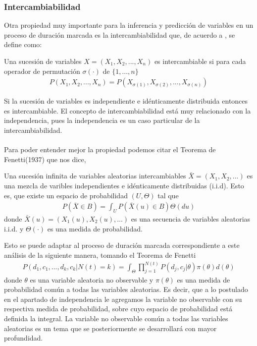 \subsubsection{Intercambiabilidad}
Otra propiedad muy importante para la inferencia y predicci\'on de variables en un proceso de duraci\'on marcada es la intercambiabilidad que, de acuerdo a \cite{hahn2012exchangeable}, se define como:
\begin{defi}
Una sucesi\'on de variables $X=(X_1,X_2,...,X_n)$ es intercambiable si para cada operador de permutaci\'on $\sigma(\cdot)$ de $\{1,...,n\}$ 
\begin{align}
P(X_1,X_2,...,X_n)=P(X_{\sigma(1)},X_{\sigma(2)},...,X_{\sigma(n)}) \nonumber
\end{align}
\end{defi}
Si la sucesi\'on de variables es independiente e id\'enticamente distribuida entonces es intercambiable. El concepto de intercambiabilidad est\'a muy relacionado con la independencia, pues la independencia es un caso particular de la intercambiabilidad.\\
\\
Para poder entender mejor la propiedad podemos citar el Teorema de Fenetti(1937) que nos dice,
\begin{teo}
Una sucesi\'on infinita de variables aleatorias intercambiables $\bar{X}=(X_1,X_2,...)$ es una mezcla de varibles independientes e id\'enticamente distribuidas (i.i.d). Esto es, que existe un espacio de probabilidad $(U,\Theta)$ tal que
\begin{align}
P(\bar{X} \in B)=\int_U P(\bar{X}(u) \in B) \Theta(du)   \nonumber
\end{align}
donde $\bar{X}(u)=(X_1(u),X_2(u),...)$ es una secuencia de variables aleatorias i.i.d. y $\Theta(\cdot)$ es una medida de probabilidad.
\end{teo}
Esto se puede adaptar al proceso de duraci\'on marcada correspondiente a este an\'alisis de la siguiente manera, tomando el Teorema de Fenetti
\begin{align}
P(d_1,c_1,...,d_k,c_k|N(t)=k)=\int_\Theta \prod_{j=1}^{N(t)} P(d_j,c_j|\theta) \pi(\theta) d(\theta)
\end{align}
donde $\theta$ es una variable aleatoria no observable y $\pi(\theta)$ es una medida de probabilidad com\'un a todas las variables aleatorias. Es decir, que a lo postulado en el apartado de independencia le agregamos la variable no observable con su respectiva medida de probabilidad, sobre cuyo espacio de probabilidad est\'a definida la integral. La variable no observable com\'un a todas las variables aleatorias es un tema que se posteriormente se desarrollar\'a con mayor profundidad.
